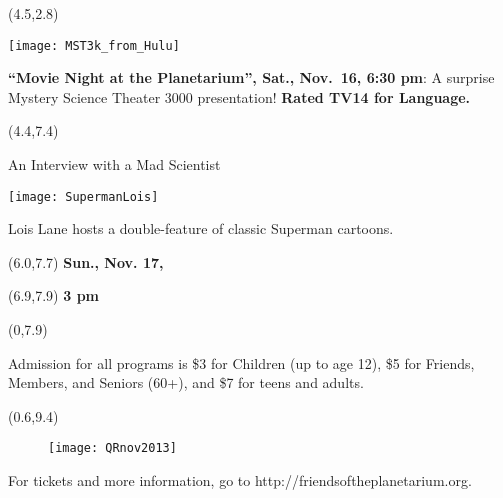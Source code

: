 \documentclass{article}
\begin{document}
\begin{textblock}{3.2}(4.5,2.8)

   \texttt{[image: MST3k\_from\_Hulu]}

   {\fontsize{16}{17}
   \textbf{“Movie Night at the Planetarium”, Sat., Nov.~16, 6:30 pm}:
    A surprise Mystery Science Theater 3000 presentation! 
    \textbf{Ra\-ted TV14 for Language.}

    }

\end{textblock}

\begin{textblock}{3.3}(4.4,7.4)
   {\fontsize{16}{17}

   An Interview with a Mad Scientist 

   \texttt{[image: SupermanLois]}

   Lois Lane hosts a double-feature of classic Superman cartoons. 

   }
\end{textblock}

   {\fontsize{16}{17}

\begin{textblock}{1.2}(6.0,7.7)
   \textbf{Sun., Nov. 17,}
\end{textblock}
\begin{textblock}{2}(6.9,7.9)
   \textbf{3 pm}
\end{textblock}

   }


\begin{textblock}{3.6}(0,7.9)
   {\fontsize{16}{17}

Admission for all programs is \$3 for Children (up to age 12), \$5 for Friends, Members, and Seniors (60+), and \$7 for teens and adults.

   }
\end{textblock}

\begin{textblock}{3}(0.6,9.4)

   {\fontsize{18}{19}
\begin{wrapfigure}{l}{0.7in}
   \texttt{[image: QRnov2013]}
\end{wrapfigure}      

For tickets and more information, go to http://friendsoftheplanetarium.org.

}
\end{textblock}
\end{document}

